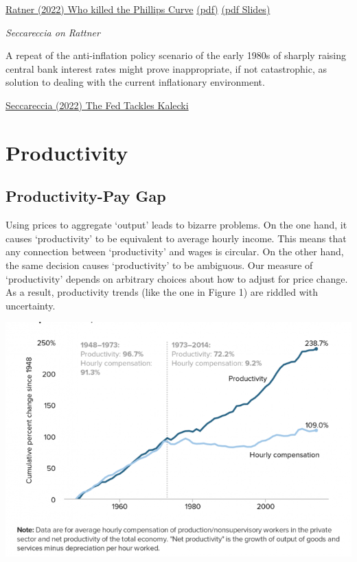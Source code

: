 \documentclass[
]{book}
\begin{document}
\href{https://papers.ssrn.com/sol3/papers.cfm?abstract_id=4118173}{Ratner (2022) Who killed the Phillips Curve}
\href{pdf/Ratner_2019_Who_killed_the_Phillips_Curve.pdf}{(pdf)}
\href{pdf/Ratner_2019_Who_killed_the_Phillips_Curve_Slides.pdf}{(pdf Slides)}

\emph{Seccareccia on Rattner}

A repeat of the anti-inflation policy scenario of the early 1980s of sharply raising central bank interest rates might prove inappropriate, if not catastrophic, as solution to dealing with the current inflationary environment.

\href{https://www.ineteconomics.org/perspectives/blog/the-fed-tackles-kalecki}{Seccareccia (2022) The Fed Tackles Kalecki}

\hypertarget{productivity}{%
\chapter{Productivity}\label{productivity}}

\hypertarget{productivity-pay-gap}{%
\section{Productivity-Pay Gap}\label{productivity-pay-gap}}

Using prices to aggregate `output' leads to bizarre problems. On the one hand, it causes `productivity' to be equivalent to average hourly income. This means that any connection between `productivity' and wages is circular. On the other hand, the same decision causes `productivity' to be ambiguous. Our measure of `productivity' depends on arbitrary choices about how to adjust for price change. As a result, productivity trends (like the one in Figure 1) are riddled with uncertainty.

\includegraphics{fig/productivity_pay_gap.png}
\end{document}
